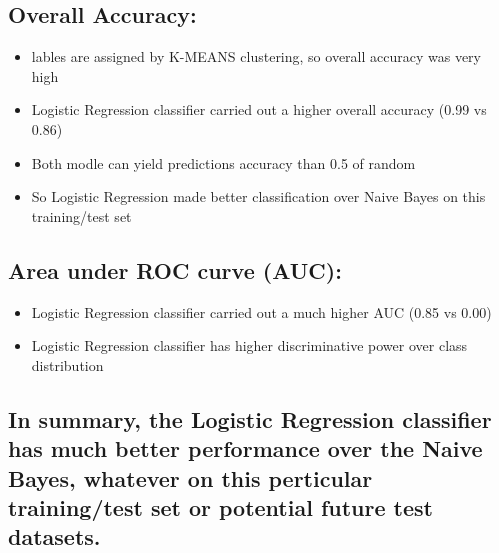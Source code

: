 \documentclass{report}
\providecommand{\tightlist}{%
      \setlength{\itemsep}{0pt}\setlength{\parskip}{0pt}}
\begin{document}
\subsection{Overall Accuracy:}\label{overall-accuracy}

\begin{itemize}
\tightlist
\item
  lables are assigned by K-MEANS clustering, so overall accuracy was
  very high
\item
  Logistic Regression classifier carried out a higher overall accuracy
  (0.99 vs 0.86)
\item
  Both modle can yield predictions accuracy than 0.5 of random
\item
  So Logistic Regression made better classification over Naive Bayes on
  this training/test set
\end{itemize}

\subsection{Area under ROC curve (AUC):}\label{area-under-roc-curve-auc}

\begin{itemize}
\tightlist
\item
  Logistic Regression classifier carried out a much higher AUC (0.85 vs
  0.00)
\item
  Logistic Regression classifier has higher discriminative power over
  class distribution
\end{itemize}

\subsection{In summary, the Logistic Regression classifier has much
better performance over the Naive Bayes, whatever on this perticular
training/test set or potential future test
datasets.}\label{in-summary-the-logistic-regression-classifier-has-much-better-performance-over-the-naive-bayes-whatever-on-this-perticular-trainingtest-set-or-potential-future-test-datasets.}
\end{document}
